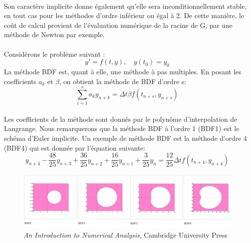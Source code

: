         \paragraph{}
        Son caractère implicite donne également qu'elle sera inconditionnellement stable, en tout cas pour les méthodes d'ordre inférieur ou égal à 2. De cette manière, le coût de calcul provient de l'évaluation numérique de la racine de G, par une méthode de Newton par exemple.

        \paragraph{}
        Considérons le problème suivant :
        \begin{equation}
            y' = f(t, y), \quad y(t_0) = y_0
        \end{equation}
        La méthode BDF est, quant à elle, une méthode à pas multiples. En posant les coefficients $a_k$ et $\beta$,  on obtient la méthode de BDF d'ordre s:
        \begin{equation}
            \sum_{i=1}^{s} a_k y_{n+k} = \Delta t \beta f(t_{n+s}, y_{n+s})
        \end{equation}

        \paragraph{}
        Les coefficients de la méthode sont donnés par le polynôme d'interpolation de Langrange. Nous remarquerons que la méthode BDF à l'ordre 1 (BDF1) est le schéma d'Euler implicite.
        Un exemple de méthode BDF est la méthode d'ordre 4 (BDF4) qui est donnée par l'équation suivante:
        \begin{equation}
            y_{n+4} - \frac{48}{25}y_{n+3}+\frac{36}{25}y_{n+2}+\frac{16}{25}y_{n+1}+\frac{3}{25}y_n = \frac{12}{25}\Delta tf(t_{n+4}, y_{n+4})
        \end{equation}
        \begin{figure}
            \centering
            \includegraphics[width=\textwidth]{images/astab_bdf.png}
            \caption{\textit{An Introduction to Numerical Analysis}, Cambridge University Press}
            \label{fig:astab_bdf}
        \end{figure}

